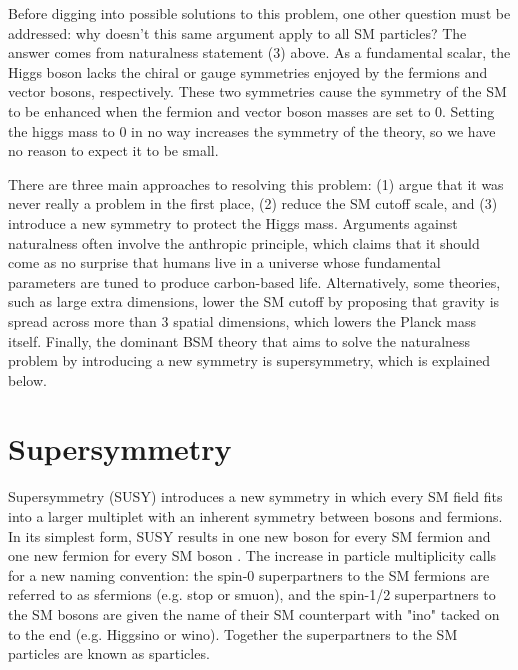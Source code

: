 \documentclass[12pt]{article}
\begin{document}
    Before digging into possible solutions to this problem, one other question must be addressed: why doesn't this same argument apply to all SM particles? The answer comes from naturalness statement (3) above. As a fundamental scalar, the Higgs boson lacks the chiral or gauge symmetries enjoyed by the fermions and vector bosons, respectively. These two symmetries cause the symmetry of the SM to be enhanced when the fermion and vector boson masses are set to 0.  Setting the higgs mass to 0 in no way increases the symmetry of the theory, so we have no reason to expect it to be small.

    There are three main approaches to resolving this problem: (1) argue that it was never really a problem in the first place, (2) reduce the SM cutoff scale, and (3) introduce a new symmetry to protect the Higgs mass. Arguments against naturalness often involve the anthropic principle, which claims that it should come as no surprise that humans live in a universe whose fundamental parameters are tuned to produce carbon-based life. Alternatively, some theories, such as large extra dimensions, lower the SM cutoff by proposing that gravity is spread across more than 3 spatial dimensions, which lowers the Planck mass itself. Finally, the dominant BSM theory that aims to solve the naturalness problem by introducing a new symmetry is supersymmetry, which is explained below. 

    
\section{Supersymmetry}
    Supersymmetry (SUSY) introduces a new symmetry in which every SM field fits into a larger multiplet with an inherent symmetry between bosons and fermions. In its simplest form, SUSY results in one new boson for every SM fermion and one new fermion for every SM boson . The increase in particle multiplicity calls for a new naming convention: the spin-0 superpartners to the SM fermions are referred to as sfermions (e.g. stop or smuon), and the spin-1/2 superpartners to the SM bosons are given the name of their SM counterpart with "ino" tacked on to the end (e.g. Higgsino or wino). Together the superpartners to the SM particles are known as sparticles. 
\end{document}
